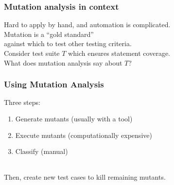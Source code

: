 \documentclass{beamer}
\newenvironment{changemargin}[1]{%
  \begin{list}{}{%
    \setlength{\topsep}{0pt}%
    \setlength{\leftmargin}{#1}%
    \setlength{\rightmargin}{1em}
    \setlength{\listparindent}{\parindent}%
    \setlength{\itemindent}{\parindent}%
    \setlength{\parsep}{\parskip}%
  }%
  \item[]}{\end{list}}
\begin{document}
\begin{frame}
  \frametitle{Mutation analysis in context}

  \begin{changemargin}{2em}
    Hard to apply by hand, and automation is complicated.\\[1em]
    Mutation is a ``gold standard'' \\
    \hspace*{2em} against which to test other testing criteria.\\[1em]
    Consider test suite $T$ which ensures statement coverage. \\
    What does mutation analysis say about $T$?
\end{changemargin}
\end{frame}

\usebackgroundtemplate{}

\begin{frame}
  \frametitle{Using Mutation Analysis}

  \Large
  \begin{changemargin}{2em}
    Three steps:
    \begin{enumerate}
    \item Generate mutants (usually with a tool)
    \item Execute mutants (computationally expensive)
    \item Classify (manual)
    \end{enumerate}
    ~\\
    Then, create new test cases to kill remaining mutants.
  \end{changemargin}
  
\end{frame}
\end{document}
